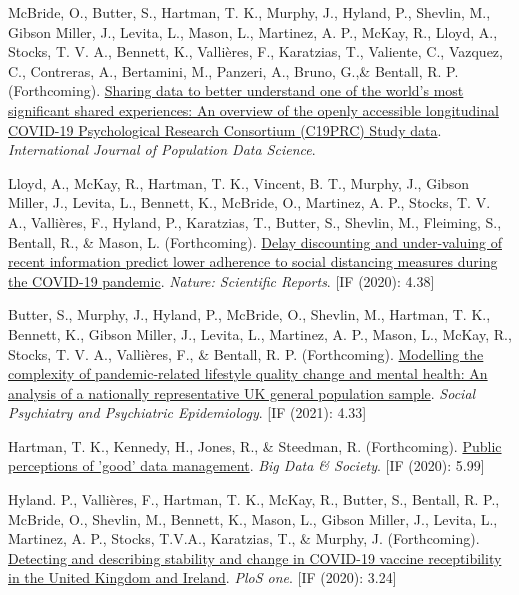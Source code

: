 \documentclass[12pt]{article}
\begin{document}
\begin{bibenum}
\item McBride, O., Butter, S., Hartman, T. K., Murphy, J., Hyland, P., Shevlin, M., Gibson Miller, J.,  Levita, L., Mason, L., Martinez, A. P., McKay, R., Lloyd, A., Stocks, T. V. A., Bennett, K., Vallières, F., Karatzias, T., Valiente, C., Vazquez, C., Contreras, A., Bertamini, M., Panzeri, A., Bruno, G.,\& Bentall, R. P. (Forthcoming). \href{}{Sharing data to better understand one of the world’s most significant shared experiences: An overview of the openly accessible longitudinal COVID-19 Psychological Research Consortium (C19PRC) Study data}. 
	\emph{International Journal of Population Data Science}.

	\item Lloyd, A., McKay, R., Hartman, T. K., Vincent, B. T., Murphy, J., Gibson Miller, J., Levita, L., 
	Bennett, K., McBride, O.,  Martinez, A. P., Stocks, T. V. A., Vallières, F., Hyland, P., Karatzias, T., 
	Butter, S., Shevlin, M., Fleiming, S., Bentall, R., \& Mason, L.  (Forthcoming). 
		\href{https://psyarxiv.com/kvynr/}
		{Delay discounting and under-valuing of recent information predict lower adherence 
		to social distancing measures during the COVID-19 	pandemic}.
		\emph{Nature: Scientific Reports}. [IF (2020): 4.38]
		

\item Butter, S.,  Murphy, J., Hyland, P., McBride, O., Shevlin, M., Hartman, T. K., Bennett, K., Gibson Miller, J., Levita, L., Martinez, A. P., Mason, L., McKay, R., Stocks, T. V. A., Vallières, F., \& Bentall, R. P. (Forthcoming). \href{https://psyarxiv.com/2vw7d/}{Modelling the complexity of pandemic-related lifestyle quality change and mental health: An analysis of a nationally representative UK general population sample}. 
\emph{Social Psychiatry and Psychiatric Epidemiology}. [IF (2021): 4.33]

	\item Hartman, T. K., Kennedy, H., Jones, R., \& Steedman, R. (Forthcoming). 
		\href{https://doi.org/10.1177/2053951720935616}{Public perceptions of 'good' data management}.
	 	\emph{Big Data \& Society}. [IF (2020): 5.99]
		
	\item Hyland. P., Vallières, F., Hartman, T. K., McKay, R., 
	Butter, S., Bentall, R. P., McBride, O., Shevlin, M., Bennett, K., 
	Mason, L., Gibson Miller, J., Levita, L., Martinez, A. P.,
	Stocks, T.V.A., Karatzias, T., \& Murphy, J. (Forthcoming). 
	\href{}
	{Detecting and describing stability and change in COVID-19 vaccine receptibility in the United Kingdom and Ireland}. 
	\emph{PloS one}. [IF (2020): 3.24]


\end{bibenum}
\end{document}
